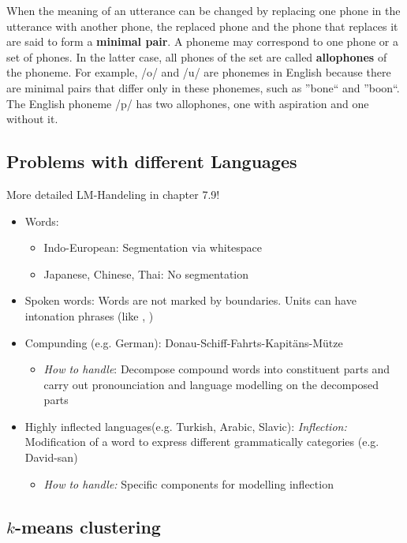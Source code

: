 When the meaning of an utterance can be changed by replacing one phone in the utterance with another phone, the replaced phone and the phone that replaces it are said to form a \textbf{minimal pair}.
A phoneme may correspond to one phone or a set of phones. In the latter case, all phones of the set are called \textbf{allophones} of the phoneme.
For example, /o/ and /u/ are phonemes in English because there are minimal pairs that differ only in these phonemes, such as ''bone`` and ''boon``. The English phoneme /p/ has two allophones, one with aspiration and one without it.

\subsection{Problems with different Languages}
More detailed LM-Handeling in chapter 7.9!
\begin{itemize}
\item{Words:}
\begin{itemize}
\item{Indo-European:} Segmentation via whitespace
\item{Japanese, Chinese, Thai:} No segmentation
\end{itemize}

\item{Spoken words:} Words are not marked by boundaries. Units can have intonation phrases (like , )

\item{Compunding (e.g. German):} Donau-Schiff-Fahrts-Kapitäns-Mütze 
\begin{itemize}
\item \emph{How to handle}: Decompose compound words into constituent parts and carry out pronounciation and language modelling on the decomposed parts
\end{itemize}
 
 \item Highly inflected languages(e.g. Turkish, Arabic, Slavic): \emph{Inflection:} Modification of a word to express different grammatically categories (e.g. David-san) 
 \begin{itemize}
 \item \emph{How to handle:} Specific components for modelling inflection
 \end{itemize}

\end{itemize}


\subsection{$k$-means clustering}

